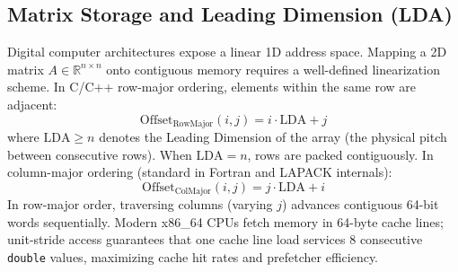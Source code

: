 \documentclass[11pt,a4paper]{article}
\begin{document}
\subsection{Matrix Storage and Leading Dimension (LDA)}
Digital computer architectures expose a linear 1D address space. Mapping a 2D matrix $A \in \mathbb{R}^{n \times n}$ onto contiguous memory requires a well-defined linearization scheme. In C/C++ row-major ordering, elements within the same row are adjacent:
\begin{equation}
\text{Offset}_{\text{RowMajor}}(i, j) = i \cdot \text{LDA} + j
\end{equation}
where $\text{LDA} \ge n$ denotes the Leading Dimension of the array (the physical pitch between consecutive rows). When $\text{LDA} = n$, rows are packed contiguously. In column-major ordering (standard in Fortran and LAPACK internals):
\begin{equation}
\text{Offset}_{\text{ColMajor}}(i, j) = j \cdot \text{LDA} + i
\end{equation}
In row-major order, traversing columns (varying $j$) advances contiguous 64-bit words sequentially. Modern x86\_64 CPUs fetch memory in 64-byte cache lines; unit-stride access guarantees that one cache line load services 8 consecutive \texttt{double} values, maximizing cache hit rates and prefetcher efficiency.
\end{document}
